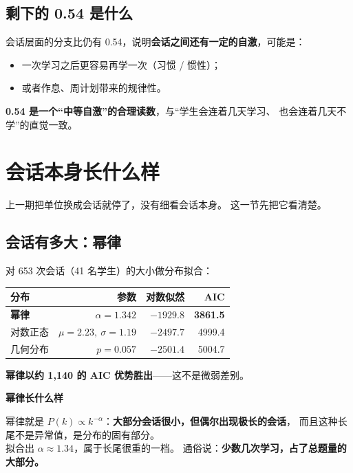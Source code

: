 \documentclass[UTF8,a4paper,11pt]{ctexart}
\newenvironment{explainbox}[1]
{\begin{center}\begin{minipage}{0.94\textwidth}\colorbox{boxbg}{\parbox{0.92\textwidth}{\textbf{#1}\par\vspace{2pt}}}}
{\end{minipage}\end{center}}
\begin{document}
\subsection{剩下的 0.54 是什么}

会话层面的分支比仍有 0.54，说明\textbf{会话之间还有一定的自激}，可能是：

\begin{itemize}[leftmargin=1.6em]
\item 一次学习之后更容易再学一次（习惯 / 惯性）；
\item 或者作息、周计划带来的规律性。
\end{itemize}

\textbf{0.54 是一个“中等自激”的合理读数}，与“学生会连着几天学习、
也会连着几天不学”的直觉一致。

\newpage


\section{会话本身长什么样}

上一期把单位换成会话就停了，没有细看会话本身。
这一节先把它看清楚。

\subsection{会话有多大：幂律}

对 653 次会话（41 名学生）的大小做分布拟合：

\begin{center}
\begin{tabular}{p{4.0cm}rrr}
\toprule
\textbf{分布} & \textbf{参数} & \textbf{对数似然} & \textbf{AIC} \\
\midrule
\textbf{幂律} & $\alpha = 1.342$ & $-1929.8$ & \textbf{3861.5} \\
对数正态 & $\mu=2.23,\ \sigma=1.19$ & $-2497.7$ & 4999.4 \\
几何分布 & $p = 0.057$ & $-2501.4$ & 5004.7 \\
\bottomrule
\end{tabular}
\end{center}

\textbf{幂律以约 1,140 的 AIC 优势胜出}——这不是微弱差别。

\begin{explainbox}{幂律长什么样}
幂律就是 $P(k) \propto k^{-\alpha}$：\textbf{大部分会话很小，但偶尔出现极长的会话}，
而且这种长尾不是异常值，是分布的固有部分。\\[4pt]
拟合出 $\alpha \approx 1.34$，属于长尾很重的一档。
通俗说：\textbf{少数几次学习，占了总题量的大部分。}
\end{explainbox}
\end{document}
